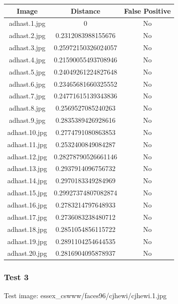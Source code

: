 \documentclass[12pt]{article}
\begin{document}
\begin{center}
\begin{tabular}{ccc}
Image & Distance & False Positive \\
\hline
adhast.1.jpg & 0 & No \\
adhast.2.jpg & 0.2312083988155676 & No \\
adhast.3.jpg & 0.25972150326024057 & No \\
adhast.4.jpg & 0.21590055493708946 & No \\
adhast.5.jpg & 0.24049261224827648 & No \\
adhast.6.jpg & 0.23465681660325552 & No \\
adhast.7.jpg & 0.24771615139343836 & No \\
adhast.8.jpg & 0.2569527085240263 & No \\
adhast.9.jpg & 0.2835389426928616 & No \\
adhast.10.jpg & 0.2774791080863853 & No \\
adhast.11.jpg & 0.2532400849084287 & No \\
adhast.12.jpg & 0.28278790526661146 & No \\
adhast.13.jpg & 0.2937914096756732 & No \\
adhast.14.jpg & 0.2970183349284969 & No \\
adhast.15.jpg & 0.29927374807082874 & No \\
adhast.16.jpg & 0.2783214797648933 & No \\
adhast.17.jpg & 0.2736083238480712 & No \\
adhast.18.jpg & 0.2851054856115722 & No \\
adhast.19.jpg & 0.2891104254644535 & No \\
adhast.20.jpg & 0.2816904095878937 & No \\
\end{tabular}
\end{center}

\subsubsection{Test 3}
Test image: essex\_cswww/faces96/cjhewi/cjhewi.1.jpg
\end{document}
